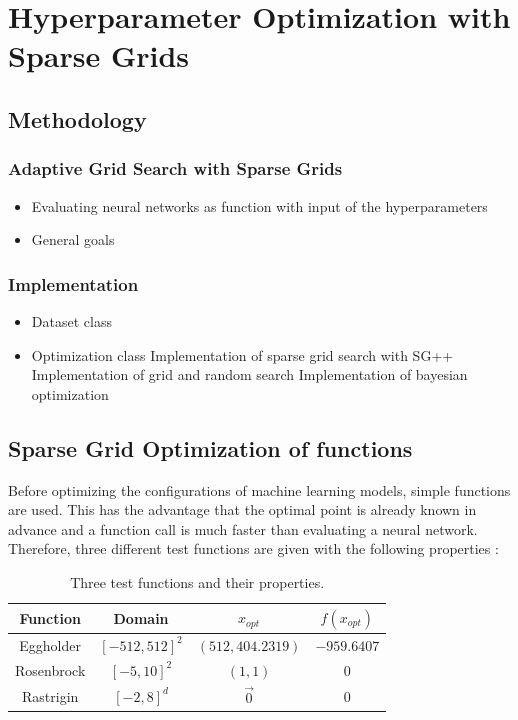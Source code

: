 
\chapter{Hyperparameter Optimization with Sparse Grids}\label{chapter:main_part}

\section{Methodology}

\subsection{Adaptive Grid Search with Sparse Grids}

\begin{itemize}
	\item Evaluating neural networks as function with input of the hyperparameters
	\item General goals
\end{itemize}

\subsection{Implementation}

\begin{itemize}
	\item Dataset class
	\item Optimization class
		\subitem Implementation of sparse grid search with SG++
		\subitem Implementation of grid and random search
		\subitem Implementation of bayesian optimization
\end{itemize}


\section{Sparse Grid Optimization of functions}

Before optimizing the configurations of machine learning models, simple functions are used. This has the advantage that the optimal point is already known in advance and a function call is much faster than evaluating a neural network. Therefore, three different test functions are given with the following properties \cite{valentin2016hierarchical}:

\begin{table}[htbp!]
		\centering
	\begin{tabular}{|c c c c|} 
		\hline
		Function & Domain & $x_{opt}$ & $ f(x_{opt}) $\\
		\hline
		Eggholder & $[-512, 512]^2 $ & $(512, 404.2319)$ & $ -959.6407 $ \\
		Rosenbrock & $[-5, 10]^2 $ & $(1,1)$ & $ 0 $ \\
		Rastrigin & $[-2, 8]^d $ & $\vec{0}$ & $ 0 $ \\
		\hline
	\end{tabular}
	\caption{ Three test functions and their properties.}
	\label{tab:test_functions}
\end{table}

